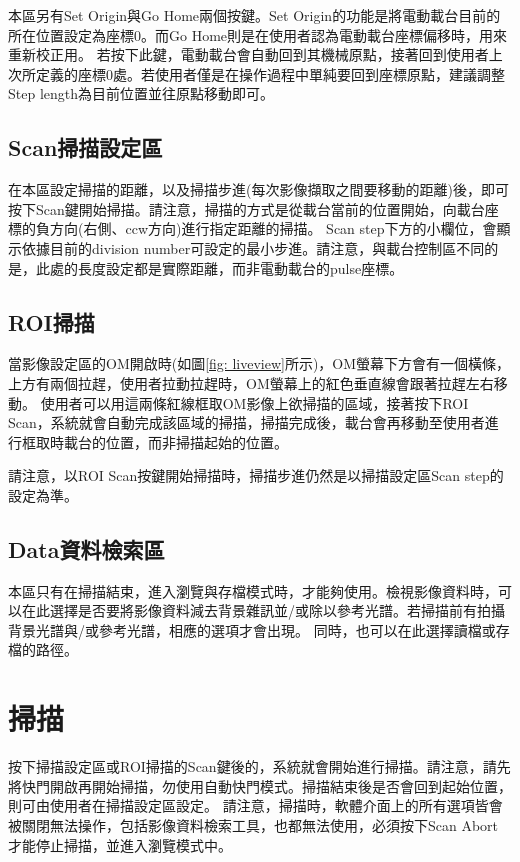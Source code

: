 \documentclass[12pt]{article}
\begin{document}
    本區另有Set Origin與Go Home兩個按鍵。Set Origin的功能是將電動載台目前的所在位置設定為座標0。而Go Home則是在使用者認為電動載台座標偏移時，用來重新校正用。
    若按下此鍵，電動載台會自動回到其機械原點，接著回到使用者上次所定義的座標0處。若使用者僅是在操作過程中單純要回到座標原點，建議調整Step length為目前位置並往原點移動即可。
    \subsection{Scan掃描設定區}
    在本區設定掃描的距離，以及掃描步進(每次影像擷取之間要移動的距離)後，即可按下Scan鍵開始掃描。請注意，掃描的方式是從載台當前的位置開始，向載台座標的負方向(右側、ccw方向)進行指定距離的掃描。
    Scan step下方的小欄位，會顯示依據目前的division number可設定的最小步進。請注意，與載台控制區不同的是，此處的長度設定都是實際距離，而非電動載台的pulse座標。
    \subsection{ROI掃描}\label{sec: roi scan}
    當影像設定區的OM開啟時(如圖\ref{fig: liveview}所示)，OM螢幕下方會有一個橫條，上方有兩個拉趕，使用者拉動拉趕時，OM螢幕上的紅色垂直線會跟著拉趕左右移動。
    使用者可以用這兩條紅線框取OM影像上欲掃描的區域，接著按下ROI Scan，系統就會自動完成該區域的掃描，掃描完成後，載台會再移動至使用者進行框取時載台的位置，而非掃描起始的位置。

    請注意，以ROI Scan按鍵開始掃描時，掃描步進仍然是以掃描設定區Scan step的設定為準。
    \subsection{Data資料檢索區}
    本區只有在掃描結束，進入瀏覽與存檔模式時，才能夠使用。檢視影像資料時，可以在此選擇是否要將影像資料減去背景雜訊並/或除以參考光譜。若掃描前有拍攝背景光譜與/或參考光譜，相應的選項才會出現。
    同時，也可以在此選擇讀檔或存檔的路徑。
    \section{掃描}
    按下掃描設定區或ROI掃描的Scan鍵後的，系統就會開始進行掃描。請注意，請先將快門開啟再開始掃描，勿使用自動快門模式。掃描結束後是否會回到起始位置，則可由使用者在掃描設定區設定。
    請注意，掃描時，軟體介面上的所有選項皆會被關閉無法操作，包括影像資料檢索工具，也都無法使用，必須按下Scan Abort才能停止掃描，並進入瀏覽模式中。
    
\end{document}

